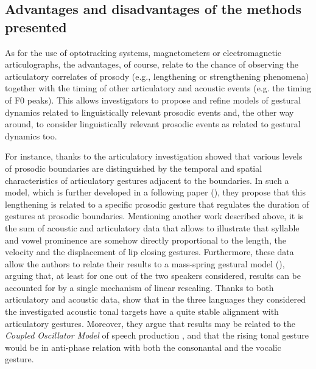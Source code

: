 \documentclass[output=paper]{langsci/langscibook}
\begin{document}
 
\subsection{Advantages and disadvantages of the methods presented} \label{sec:gil:2:3}\largerpage
As for the use of optotracking systems, magnetometers or electromagnetic articulographs, the advantages, of course, relate to the chance of observing the articulatory correlates of prosody (e.g., lengthening or strengthening phenomena) together with the timing of other articulatory and acoustic events (e.g. the timing of F0 peaks). This allows investigators to propose and refine models of gestural dynamics related to linguistically relevant prosodic events and, the other way around, to consider linguistically relevant prosodic events as related to gestural dynamics too.

For instance, thanks to the articulatory investigation \citet{Byrd1998} showed that various levels of prosodic boundaries are distinguished by the temporal and spatial characteristics of articulatory gestures adjacent to the boundaries. In such a model, which is further developed in a following paper (\citealt{Byrd2003}), they propose that this lengthening is related to a specific prosodic gesture that regulates the duration of gestures at prosodic boundaries. Mentioning another work described above, it is the sum of acoustic and articulatory data that allows \citet{Avesani2007} to illustrate that syllable and vowel prominence are somehow directly proportional to the length, the velocity and the displacement of lip closing gestures. Furthermore, these data allow the authors to relate their results to a mass-spring gestural model (\citealt{Browman1995,Fowler1995,Saltzman1995,Saltzman1989}), arguing that, at least for one out of the two speakers considered, results can be accounted for by a single mechanism of linear rescaling. Thanks to both articulatory and acoustic data, \citet{Stella2014} show that in the three languages they considered the investigated acoustic tonal targets have a quite stable alignment with articulatory gestures. Moreover, they argue that results may be related to the \textit{Coupled Oscillator Model} of speech production \citep{Goldstein2009}, and that the rising tonal gesture would be in anti-phase relation with both the consonantal and the vocalic gesture.
\end{document}
